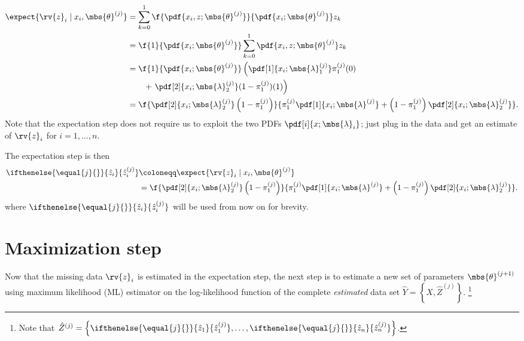\documentclass{tufte-handout}
\newcommand{\zhat}[2][{}]{\ifthenelse{\equal{#1}{}}{\hat{z}_{#2}}{\hat{z}_{#2}^{(#1)}}}
\begin{document}
    \begin{align}
        \expect{\rv{z}_{i} \mid x_{i}, \mbs{\theta}^{(j)}}
        &=
        \sum_{k=0}^{1}\f{\pdf{x_{i},z;\mbs{\theta}^{(j)}}}{\pdf{x_{i}; \mbs{\theta}^{(j)}}}z_{k}\\
        &=
        \f{1}{\pdf{x_{i}; \mbs{\theta}^{(j)}}}\sum_{k=0}^{1}\pdf{x_{i},z;\mbs{\theta}^{(j)}}z_{k}\\
        &=
        \f{1}{\pdf{x_{i}; \mbs{\theta}^{(j)}}}\left( \pdf[1]{x_{i}; \mbs{\lambda}_{1}^{(j)}}\pi_{1}^{(j)}(0)\right.\nonumber\\&\qquad + \left.\pdf[2]{x_{i}; \mbs{\lambda}_{2}^{(j)}}(1-\pi_{1}^{(j)})(1) \right)\\
        &=
        \f{
            \pdf[2]{x_{i}; \mbs{\lambda}_{2}^{(j)}}\left(1-\pi_{1}^{(j)}\right)
        }{
            \pi_{1}^{(j)}\pdf[1]{x_{i}; \mbs{\lambda}^{(j)}} + \left( 1-\pi_{1}^{(j)} \right)\pdf[2]{x_{i}; \mbs{\lambda}_{2}^{(j)}}
        }.
    \end{align}
    Note that the expectation step does not require us to exploit the two PDFs $\pdf[i]{x; \mbs{\lambda}_{i}}$; just plug in the data and get an estimate of $\rv{z}_{i}$ for $i=1,\ldots, n$.

    
    \begin{blueBox}
        The expectation step is then        
        \begin{align}
            \label{eq:xhat notation def}
            \zhat[j]{i} &\coloneqq  
            \expect{\rv{z}_{i} \mid x_{i}, \mbs{\theta}^{(j)}}\\
            &= \f{
                \pdf[2]{x_{i}; \mbs{\lambda}_{2}^{(j)}}\left(1-\pi_{1}^{(j)}\right)
            }{
                \pi_{1}^{(j)}\pdf[1]{x_{i}; \mbs{\lambda}^{(j)}} + \left( 1-\pi_{1}^{(j)} \right)\pdf[2]{x_{i}; \mbs{\lambda}_{2}^{(j)}}
            }.
        \end{align}
        where $\zhat[j]{i}$ will be used from now on for brevity.
    \end{blueBox}



    \section{Maximization step}
    Now that the missing data $\rv{z}_{i}$ is estimated in the expectation step, the next step is to estimate a new set of parameters $\mbs{\theta}^{(j+1)}$ using maximum likelihood (ML) estimator on the log-likelihood function of the complete \emph{estimated} data set $\hat{Y} = \left\{ X, \hat{Z}^{(j)} \right\}$. \footnote{Note that $\hat{Z}^{(j)} = \left\{ \zhat[j]{1},\ldots, \zhat[j]{n} \right\}$.}
\end{document}
